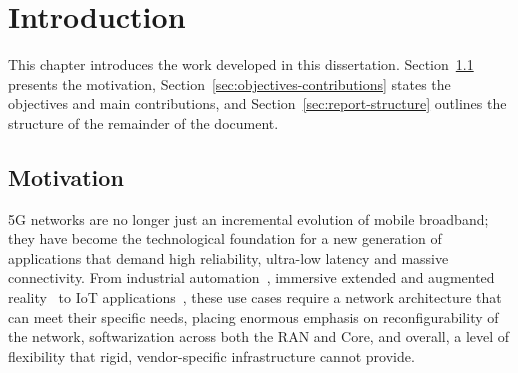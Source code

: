 %

\chapter{Introduction}
\label{cha:introduction}
This chapter introduces the work developed in this dissertation. Section~\ref{sec:motivation} presents the motivation, Section~\ref{sec:objectives-contributions} states the objectives and main contributions, and Section~\ref{sec:report-structure} outlines the structure of the remainder of the document.

\section{Motivation}
\label{sec:motivation}

5G networks are no longer just an incremental evolution of mobile broadband; they have become the technological foundation for a new generation of applications that demand high reliability, ultra-low latency and massive connectivity. From industrial automation~\cite{Khujamatov2021, brown2018ultrareliable, 13-electronics11030412}, immersive extended and augmented reality~\cite{16-TorresVega2020, LV2020158, 9363323} to \gls{IoT} applications~\cite{7835795, 8519960}, these use cases require a network architecture that can meet their specific needs, placing enormous emphasis on reconfigurability of the network, softwarization across both the \gls{RAN} and Core, and overall, a level of flexibility that rigid, vendor-specific infrastructure cannot provide.

